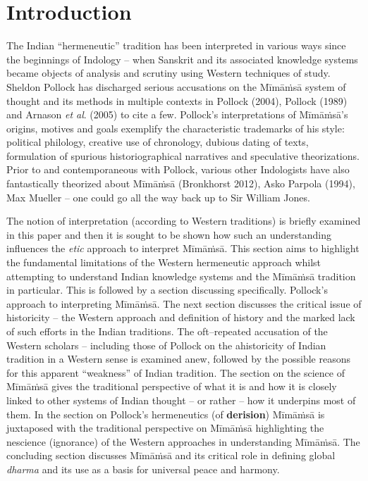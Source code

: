 \section*{Introduction}

The Indian “hermeneutic” tradition has been interpreted in various ways since the beginnings of Indology – when Sanskrit and its associated knowledge systems became objects of analysis and scrutiny using Western techniques of study. Sheldon Pollock has discharged serious accusations on the Mīmāṁsā system of thought and its methods in multiple contexts in Pollock (2004), Pollock (1989) and Arnason \textit{et al}. (2005) to cite a few. Pollock’s interpretations of Mīmāṁsā’s origins, motives and goals exemplify the characteristic trademarks of his style: political philology, creative use of chronology, dubious dating of texts, formulation of spurious historiographical narratives and speculative theorizations. Prior to and contemporaneous with Pollock, various other Indologists have also fantastically theorized about Mīmāṁsā (Bronkhorst 2012), Asko Parpola (1994), Max Mueller – one could go all the way back up to Sir William Jones.

The notion of interpretation (according to Western traditions) is briefly examined in this paper and then it is sought to be shown how such an understanding influences the \textit{etic} approach to interpret Mīmāṁsā. This section aims to highlight the fundamental limitations of the Western hermeneutic approach whilst attempting to understand Indian knowledge systems and the Mīmāṁsā tradition in particular. This is followed by a section discussing specifically. Pollock’s approach to interpreting Mīmāṁsā. The next section discusses the critical issue of historicity – the Western approach and definition of history and the marked lack of such efforts in the Indian traditions. The oft–repeated accusation of the Western scholars – including those of Pollock on the ahistoricity of Indian tradition in a Western sense is examined anew, followed by the possible reasons for this apparent “weakness” of Indian tradition. The section on the science of Mīmāṁsā gives the traditional perspective of what it is and how it is closely linked to other systems of Indian thought – or rather – how it underpins most of them. In the section on Pollock’s hermeneutics (of \textbf{derision}) Mīmāṁsā is juxtaposed with the traditional perspective on Mīmāṁsā highlighting the nescience (ignorance) of the Western approaches in understanding Mīmāṁsā. The concluding section discusses Mīmāṁsā and its critical role in defining global \textit{dharma} and its use as a basis for universal peace and harmony.


